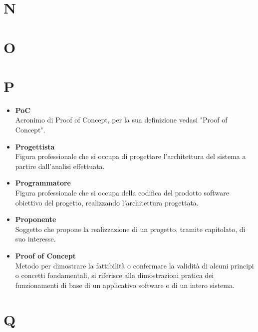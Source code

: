 \documentclass[a4paper,12pt]{article}
\begin{document}
        \section*{N} {
            
        }
        \newpage

        \section*{O} {
            
        }
        \newpage

        \section*{P} {
            \begin{itemize}
                \item \textbf{PoC}\\
                    Acronimo di Proof of Concept, per la sua definizione vedasi "Proof of Concept".
                \item \textbf{Progettista}\\
                    Figura professionale che si occupa di progettare l'architettura del sistema a partire dall'analisi effettuata.
                \item \textbf{Programmatore}\\
                    Figura professionale che si occupa della codifica del prodotto software obiettivo del progetto, realizzando l'architettura progettata.
                \item \textbf{Proponente}\\
                    Soggetto che propone la realizzazione di un progetto, tramite capitolato, di suo interesse.
                \item \textbf{Proof of Concept}\\
                    Metodo per dimostrare la fattibilità o confermare la validità di alcuni principi o concetti fondamentali, si riferisce alla dimostrazioni pratica dei funzionamenti di base di un applicativo software o di un intero sistema.
            \end{itemize}
        }
        \newpage

        \section*{Q} {
            
        }
        \newpage
\end{document}
